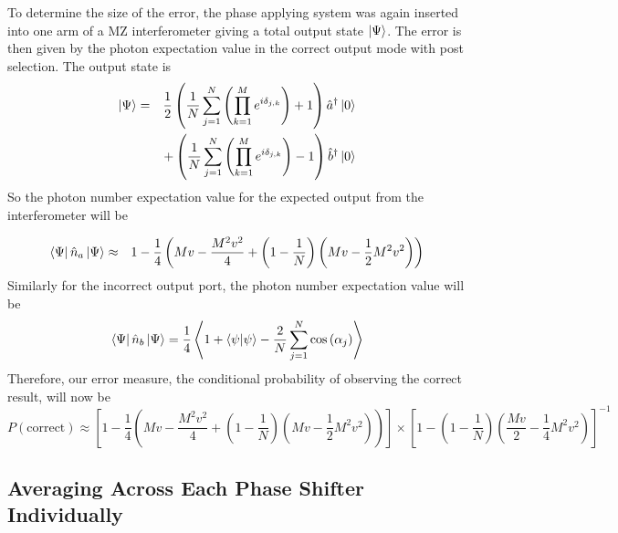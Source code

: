 \documentclass[aps,pra,twocolumn,superscriptaddress,numerical,floatfix]{revtex4-1}
\begin{document}
To determine the size of the error, the phase applying system was again inserted into one arm of a MZ interferometer giving a total output state $\ket{\Psi}$. The error is then given by the photon expectation value in the correct output mode with post selection. The output state is
\begin{eqnarray}
	\ket{\Psi}& = &\frac{1}{2}\left(\frac{1}{N}\sum_{j=1}^{N}\left(\prod_{k=1}^{M}e^{i\delta_{j,k}}\right)+1\right)\hat{a}^{\dagger}\ket{0}\\ & & +\left(\frac{1}{N}\sum_{j=1}^{N}\left(\prod_{k=1}^{M}e^{i\delta_{j,k}}\right)-1\right)\hat{b}^{\dagger}\ket{0}\label{eq:AveEndIntState}
\end{eqnarray}
So the photon number expectation value for the expected output from the interferometer will be
\begin{widetext}
\begin{eqnarray}
	\bra{\Psi}\hat{n}_{a}\ket{\Psi}
& \approx & 1-\frac{1}{4}\left(Mv-\frac{M^{2}v^{2}}{4}+\left(1-\frac{1}{N}\right)\left(Mv-\frac{1}{2}M^{2}v^{2}\right)\right)
\end{eqnarray}
Similarly for the incorrect output port, the photon number expectation value will be
\begin{equation}
	\bra{\Psi}\hat{n}_{b}\ket{\Psi} = \frac{1}{4}\left\langle 1+\left\langle \psi|\psi\right\rangle -\frac{2}{N}\sum_{j=1}^{N}\cos\left(\alpha_{j}\right)\right\rangle 
\end{equation}
Therefore, our error measure, the conditional probability of observing the correct result, will now be
\begin{equation}
P(\textrm{correct})  \approx  \left[1-\frac{1}{4}\left(Mv-\frac{M^{2}v^{2}}{4}+\left(1-\frac{1}{N}\right)\left(Mv-\frac{1}{2}M^{2}v^{2}\right)\right)\right]\nonumber\times\left[1-\left(1-\frac{1}{N}\right)\left(\frac{Mv}{2}-\frac{1}{4}M^{2}v^{2}\right)\right]^{-1}\label{eq:ErrorAvEnd}
\end{equation}
\end{widetext}

\subsection{Averaging Across Each Phase Shifter Individually\label{Averaging Across Each Phase Shifter Individually}}
\end{document}
